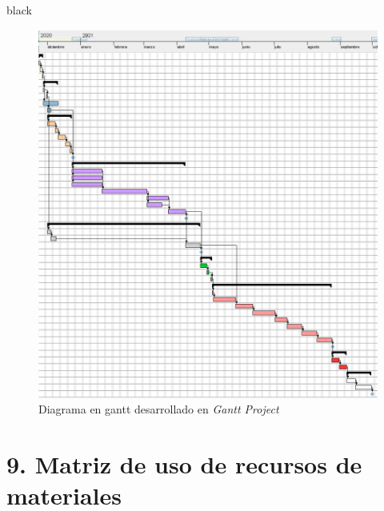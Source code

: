 \documentclass[11pt]{charter}
\begin{document}
\begin{consigna}{black}
\begin{figure}[htpb]
\centering 
\centering 
\includegraphics[width=1\textwidth]{./Figuras/DiagramaGantt_Tareas.png}
\caption{Diagrama en gantt desarrollado en \textit{Gantt Project}}
\label{fig:gantt2}
\end{figure}

\end{consigna}

\section{9. Matriz de uso de recursos de materiales}
\label{sec:recursos}
\end{document}
